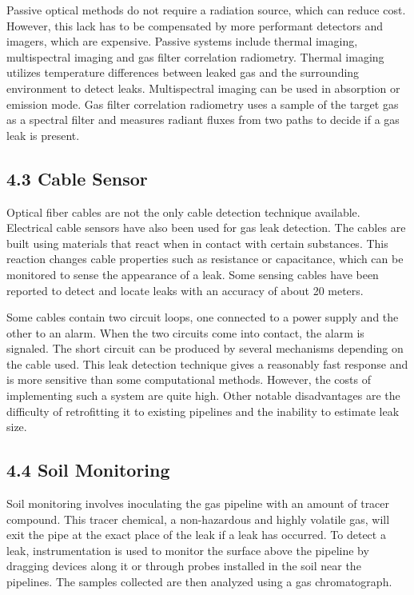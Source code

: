 Passive optical methods do not require a radiation source, which can reduce cost. However, this lack has to be compensated by more performant detectors and imagers, which are expensive. Passive systems include thermal imaging, multispectral imaging and gas filter correlation radiometry. Thermal imaging utilizes temperature differences between leaked gas and the surrounding environment to detect leaks. Multispectral imaging can be used in absorption or emission mode. Gas filter correlation radiometry uses a sample of the target gas as a spectral filter and measures radiant fluxes from two paths to decide if a gas leak is present.

\subsection*{4.3 Cable Sensor}

Optical fiber cables are not the only cable detection technique available. Electrical cable sensors have also been used for gas leak detection. The cables are built using materials that react when in contact with certain substances. This reaction changes cable properties such as resistance or capacitance, which can be monitored to sense the appearance of a leak. Some sensing cables have been reported to detect and locate leaks with an accuracy of about 20 meters.

Some cables contain two circuit loops, one connected to a power supply and the other to an alarm. When the two circuits come into contact, the alarm is signaled. The short circuit can be produced by several mechanisms depending on the cable used. This leak detection technique gives a reasonably fast response and is more sensitive than some computational methods. However, the costs of implementing such a system are quite high. Other notable disadvantages are the difficulty of retrofitting it to existing pipelines and the inability to estimate leak size.

\subsection*{4.4 Soil Monitoring}

Soil monitoring involves inoculating the gas pipeline with an amount of tracer compound. This tracer chemical, a non-hazardous and highly volatile gas, will exit the pipe at the exact place of the leak if a leak has occurred. To detect a leak, instrumentation is used to monitor the surface above the pipeline by dragging devices along it or through probes installed in the soil near the pipelines. The samples collected are then analyzed using a gas chromatograph.

